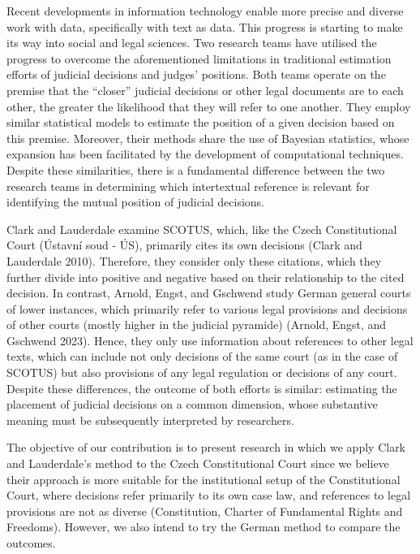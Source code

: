 \documentclass[
  11pt,
]{article}
\begin{document}
Recent developments in information technology enable more precise and
diverse work with data, specifically with text as data. This progress is
starting to make its way into social and legal sciences. Two research
teams have utilised the progress to overcome the aforementioned
limitations in traditional estimation efforts of judicial decisions and
judges' positions. Both teams operate on the premise that the ``closer''
judicial decisions or other legal documents are to each other, the
greater the likelihood that they will refer to one another. They employ
similar statistical models to estimate the position of a given decision
based on this premise. Moreover, their methods share the use of Bayesian
statistics, whose expansion has been facilitated by the development of
computational techniques. Despite these similarities, there is a
fundamental difference between the two research teams in determining
which intertextual reference is relevant for identifying the mutual
position of judicial decisions.

Clark and Lauderdale examine SCOTUS, which, like the Czech
Constitutional Court (Ústavní soud - ÚS), primarily cites its own
decisions (Clark and Lauderdale 2010). Therefore, they consider only
these citations, which they further divide into positive and negative
based on their relationship to the cited decision. In contrast, Arnold,
Engst, and Gschwend study German general courts of lower instances,
which primarily refer to various legal provisions and decisions of other
courts (mostly higher in the judicial pyramide) (Arnold, Engst, and
Gschwend 2023). Hence, they only use information about references to
other legal texts, which can include not only decisions of the same
court (as in the case of SCOTUS) but also provisions of any legal
regulation or decisions of any court. Despite these differences, the
outcome of both efforts is similar: estimating the placement of judicial
decisions on a common dimension, whose substantive meaning must be
subsequently interpreted by researchers.

The objective of our contribution is to present research in which we
apply Clark and Lauderdale's method to the Czech Constitutional Court
since we believe their approach is more suitable for the institutional
setup of the Constitutional Court, where decisions refer primarily to
its own case law, and references to legal provisions are not as diverse
(Constitution, Charter of Fundamental Rights and Freedoms). However, we
also intend to try the German method to compare the outcomes.
\end{document}
